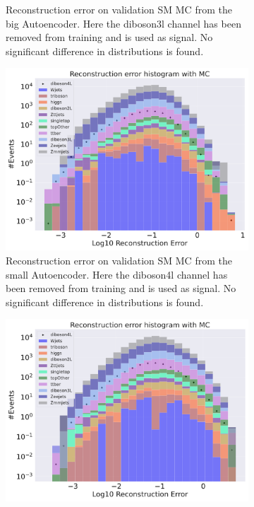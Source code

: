 \begin{figure}[H]
\begin{subfigure}{.45\textwidth}
        \caption{Reconstruction error on validation SM MC from the big Autoencoder. Here the diboson3l channel has been removed from training and 
        is used as signal. No significant difference in distributions is found. }
        \label{fig:vae_big_diboson3l}
    \end{subfigure}
    \hfill
    \begin{subfigure}{.45\textwidth}
        \includegraphics[width=\textwidth]{Figures/VAE_testing/small/b_data_recon_big_rm3_feats_sig_diboson4l.pdf}
        \caption{Reconstruction error on validation SM MC from the small Autoencoder. Here the diboson4l channel has been removed from training and 
        is used as signal. No significant difference in distributions is found. }
        \label{fig:vae_small_diboson4l}
    \end{subfigure}
    \hfill 
    \begin{subfigure}{.45\textwidth}
        \includegraphics[width=\textwidth]{Figures/VAE_testing/big/b_data_recon_big_rm3_feats_sig_diboson4l.pdf}

\end{subfigure}
\end{figure}
